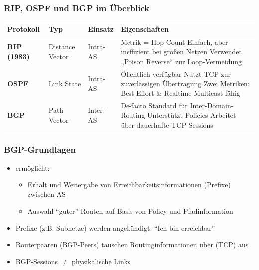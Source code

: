 \subsubsection*{RIP, OSPF und BGP im Überblick}
\begin{tabularx}{\textwidth}{|>{\bfseries}l|l|l|X|}
    \hline
    Protokoll & Typ & Einsatz & Eigenschaften \\
    \hline
    RIP (1983) & Distance Vector & Intra-AS & 
    Metrik = Hop Count \newline 
    Einfach, aber ineffizient bei großen Netzen \newline 
    Verwendet „Poison Reverse“ zur Loop-Vermeidung \\
    \hline
    OSPF & Link State & Intra-AS & 
    Öffentlich verfügbar \newline 
    Nutzt TCP zur zuverlässigen Übertragung \newline 
    Zwei Metriken: Best Effort \& Realtime \newline 
    Multicast-fähig \\
    \hline
    BGP & Path Vector & Inter-AS & 
    De-facto Standard für Inter-Domain-Routing \newline 
    Unterstützt Policies \newline 
    Arbeitet über dauerhafte TCP-Sessions \\
    \hline
\end{tabularx}
\subsubsection*{BGP-Grundlagen}
\begin{itemize}
    \item {} ermöglicht:
    \begin{itemize}
        \item Erhalt und Weitergabe von Erreichbarkeitsinformationen (Prefixe) zwischen AS
        \item Auswahl \enquote{guter} Routen auf Basis von Policy und Pfadinformation
    \end{itemize}
    \item Prefixe (z.B. Subnetze) werden angekündigt: \enquote{Ich bin erreichbar}
    \item Routerpaaren (BGP-Peers) tauschen Routinginformationen über  (TCP) aus
    \item {} BGP-Sessions $\neq$ physikalische Links
\end{itemize}
